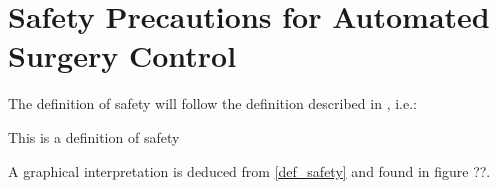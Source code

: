 \section{Safety Precautions for Automated Surgery Control}
The definition of safety will follow the definition described in \citep{bib:safety}, i.e.:
\begin{exa}
This is a definition of safety
\label{def_safety}
\end{exa}
A graphical interpretation is deduced from \autoref{def_safety} and found in figure ??.
